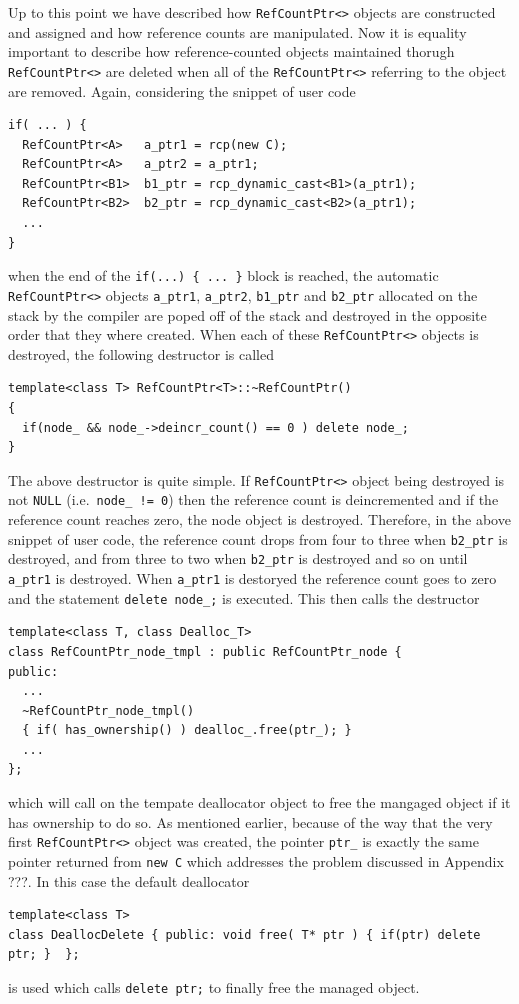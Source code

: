 Up to this point we have described how {}\texttt{Ref\-Count\-Ptr<>}
objects are constructed and assigned and how reference counts are
manipulated.  Now it is equality important to describe how
reference-counted objects maintained thorugh
{}\texttt{Ref\-Count\-Ptr<>} are deleted when all of the
{}\texttt{Ref\-Count\-Ptr<>} referring to the object are removed.
Again, considering the snippet of user code
%
{\scriptsize\begin{verbatim}
if( ... ) {
  RefCountPtr<A>   a_ptr1 = rcp(new C);
  RefCountPtr<A>   a_ptr2 = a_ptr1;
  RefCountPtr<B1>  b1_ptr = rcp_dynamic_cast<B1>(a_ptr1);
  RefCountPtr<B2>  b2_ptr = rcp_dynamic_cast<B2>(a_ptr1);
  ...
}
\end{verbatim}}
%
{}\noindent{}when the end of the {}\texttt{if(...) \{ ... \}} block is
reached, the automatic {}\texttt{RefCountPtr<>} objects
{}\texttt{a\_ptr1}, {}\texttt{a\_ptr2}, {}\texttt{b1\_ptr} and
{}\texttt{b2\_ptr} allocated on the stack by the compiler are poped
off of the stack and destroyed in the opposite order that they where
created.  When each of these {}\texttt{RefCountPtr<>} objects is
destroyed, the following destructor is called
%
{\scriptsize\begin{verbatim}
template<class T> RefCountPtr<T>::~RefCountPtr()
{
  if(node_ && node_->deincr_count() == 0 ) delete node_;
}
\end{verbatim}}
%
{}\noindent{}The above destructor is quite simple.  If
{}\texttt{RefCountPtr<>} object being destroyed is not {}\texttt{NULL}
(i.e.~{}\texttt{node\_ != 0}) then the reference count is
deincremented and if the reference count reaches zero, the node object
is destroyed.  Therefore, in the above snippet of user code, the
reference count drops from four to three when {}\texttt{b2\_ptr} is
destroyed, and from three to two when {}\texttt{b2\_ptr} is destroyed
and so on until {}\texttt{a\_ptr1} is destroyed.  When
{}\texttt{a\_ptr1} is destoryed the reference count goes to zero and
the statement {}\texttt{delete node\_;} is executed.  This then calls
the destructor
%
{\scriptsize\begin{verbatim}
template<class T, class Dealloc_T>
class RefCountPtr_node_tmpl : public RefCountPtr_node {
public:
  ...
  ~RefCountPtr_node_tmpl()
  { if( has_ownership() ) dealloc_.free(ptr_); }
  ...
};
\end{verbatim}}
%
{}\noindent{}which will call on the tempate deallocator object to free
the mangaged object if it has ownership to do so.  As mentioned
earlier, because of the way that the very first
{}\texttt{RefCountPtr<>} object was created, the pointer
{}\texttt{ptr\_} is exactly the same pointer returned from
{}\texttt{new C} which addresses the problem discussed in Appendix
???.  In this case the default deallocator 
%
{\scriptsize\begin{verbatim}
template<class T>
class DeallocDelete { public: void free( T* ptr ) { if(ptr) delete ptr; }  };
\end{verbatim}}
%
{}\noindent{}is used which calls {}\texttt{delete ptr;} to finally
free the managed object.

